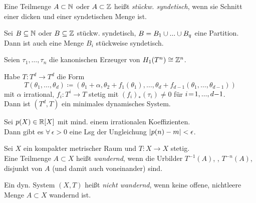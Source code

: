 \documentclass{cheat-sheet}
\begin{document}
\begin{defn}
  Eine Teilmenge $A \subset \mathbb{N}$ oder $A \subset \mathbb{Z}$ heißt \emph{stückw. syndetisch}, wenn sie Schnitt einer dicken und einer syndetischen Menge ist.
\end{defn}


\begin{thm}
  Sei $B \subseteq \mathbb{N}$ oder $B \subseteq \mathbb{Z}$ stückw. syndetisch, $B = B_1 \cup ... \cup B_q$ eine Partition.
  Dann ist auch eine Menge $B_i$ stückweise syndetisch.
\end{thm}


\begin{bem}
  Seien $\tau_1, \ldots, \tau_n$ die kanonischen Erzeuger von $H_1(T^n) \cong \mathbb{Z}^n$.
\end{bem}

\begin{lem}
  Habe $T : T^d \to T^d$ die Form
  \[
    T(\theta_1, \ldots, \theta_d) \coloneqq
    (\theta_1 + \alpha, \theta_2 + f_1(\theta_1), \ldots, \theta_d + f_{d-1}(\theta_1, \ldots, \theta_{d-1}))
  \]
  mit $\alpha$ irrational, $f_i : T^i \!\to\! T$ stetig mit $(f_i)_*(\tau_i) \!\not=\! 0$ für $i \!=\! 1, ..., d{-}1$. \\
  Dann ist $(T^d, T)$ ein minimales dynamisches System.
\end{lem}

\begin{thm}
  Sei $p(X) \in \mathbb{R}[X]$ mit mind. einem irrationalen Koeffizienten. \\
  Dann gibt es $\forall \, \epsilon > 0$ eine Lsg der Ungleichung $\lvert p(n) - m\rvert < \epsilon$.
\end{thm}


\begin{defn}
  Sei $X$ ein kompakter metrischer Raum und $T : X \to X$ stetig. \\
  Eine Teilmenge $A \subset X$ heißt \emph{wandernd}, wenn die Urbilder $T^{-1}(A)$, \nldots{}, $T^{-n}(A)$, \nldots{} disjunkt von $A$ (und damit auch voneinander) sind.
\end{defn}

\begin{defn}
  Ein dyn. System $(X, T)$ heißt \emph{nicht wandernd}, wenn keine offene, nichtleere Menge $A \subset X$ wandernd ist.
\end{defn}
\end{document}
